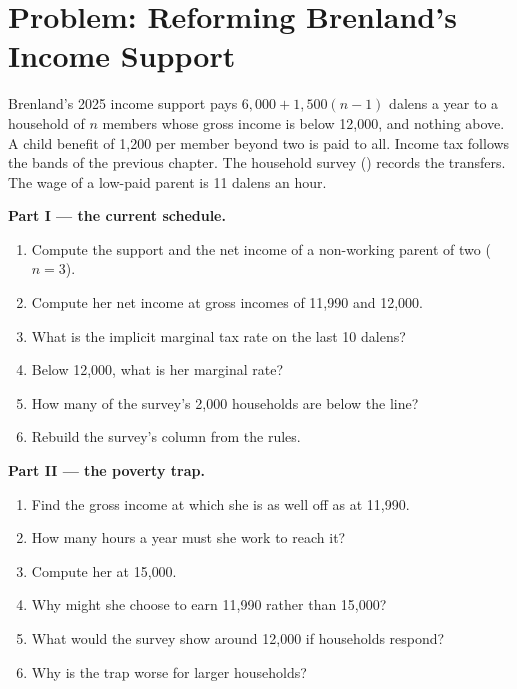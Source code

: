 \section{Problem: Reforming Brenland's Income Support}\label{sec:b3:transfers-and-incentives:problem}

\begin{problem}\label{pb:b3:transfers-and-incentives:brenland}
Brenland's 2025 income support pays $6{,}000 + 1{,}500(n - 1)$ dalens a year to a household of
$n$ members whose gross income is below 12{,}000, and nothing above. A child benefit of
1{,}200 per member beyond two is paid to all. Income tax follows the bands of the
previous chapter. The household survey () records the
transfers. The wage of a low-paid parent is 11 dalens an hour. %

\medskip\noindent\textbf{Part I --- the current schedule.}
\begin{enumerate}
\item Compute the support and the net income of a non-working parent of two
($n = 3$).
\item Compute her net income at gross incomes of 11{,}990 and 12{,}000.
\item What is the implicit marginal tax rate on the last 10 dalens?
\item Below 12{,}000, what is her marginal rate?
\item How many of the survey's 2{,}000 households are below the line?
\item Rebuild the survey's  column from the rules.
\end{enumerate}

\medskip\noindent\textbf{Part II --- the poverty trap.}
\begin{enumerate}[resume]
\item Find the gross income at which she is as well off as at 11{,}990.
\item How many hours a year must she work to reach it?
\item Compute her  at 15{,}000.
\item Why might she choose to earn 11{,}990 rather than 15{,}000?
\item What would the survey show around 12{,}000 if households respond?
\item Why is the trap worse for larger households?
\end{enumerate}


\end{problem}

